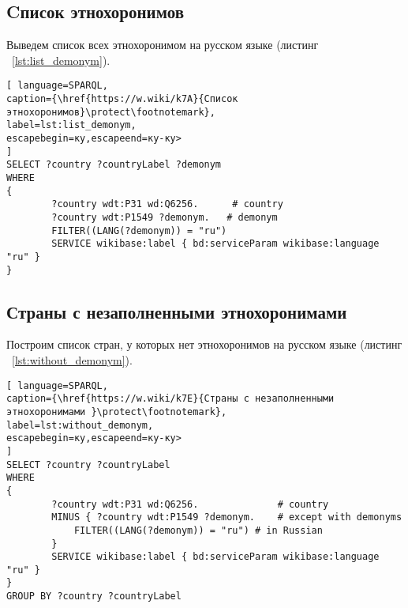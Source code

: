 

\subsection{Cписок этнохоронимов}


Выведем список всех этнохоронимом на русском языке (листинг ~\ref{lst:list_demonym}).

\begin{lstlisting}[ language=SPARQL, 
caption={\href{https://w.wiki/k7A}{Cписок этнохоронимов}\protect\footnotemark},
label=lst:list_demonym, 
escapebegin=ку,escapeend=ку-ку>
]
SELECT ?country ?countryLabel ?demonym
WHERE
{
		?country wdt:P31 wd:Q6256.      # country
		?country wdt:P1549 ?demonym.   # demonym
		FILTER((LANG(?demonym)) = "ru")
		SERVICE wikibase:label { bd:serviceParam wikibase:language "ru" }
}
\end{lstlisting}


\subsection{Страны с незаполненными этнохоронимами}

Построим список стран, у которых нет этнохоронимов на русском языке (листинг ~\ref{lst:without_demonym}).

\begin{lstlisting}[ language=SPARQL, 
caption={\href{https://w.wiki/k7E}{Страны с незаполненными этнохоронимами }\protect\footnotemark},
label=lst:without_demonym, 
escapebegin=ку,escapeend=ку-ку>
]
SELECT ?country ?countryLabel 
WHERE
{
		?country wdt:P31 wd:Q6256.              # country
		MINUS { ?country wdt:P1549 ?demonym.    # except with demonyms
			FILTER((LANG(?demonym)) = "ru") # in Russian
		}    
		SERVICE wikibase:label { bd:serviceParam wikibase:language "ru" }
}
GROUP BY ?country ?countryLabel
\end{lstlisting}

